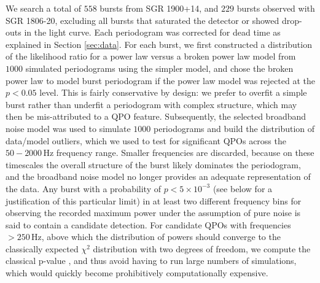 \documentclass[numberedappendix]{emulateapj}
\newcommand{\hz}{\,\mathrm{Hz}}
\begin{document}
We search a total of $558$ bursts from SGR 1900+14, and $229$ bursts observed with SGR 1806-20, excluding all bursts that saturated the detector or showed drop-outs in the light curve. 
Each periodogram was corrected for dead time as explained in Section \ref{sec:data}. 
For each burst, we first constructed a distribution of the likelihood ratio for a power law versus a broken power law model from $1000$ simulated periodograms using the simpler model, and
chose the broken power law to model burst periodogram if the power law model was rejected at the $p < 0.05$ level. This is fairly conservative by design: we prefer to overfit a simple burst rather than underfit a periodogram 
with complex structure, which may then be mis-attributed to a QPO feature. Subsequently, the selected broadband noise model was used to simulate $1000$ periodograms and build the
distribution of data/model outliers, which we used to test for significant QPOs across the $50 - 2000 \hz$ frequency range. Smaller frequencies are discarded, because on these timescales the overall structure of
the burst likely dominates the periodogram, and the broadband noise model no longer provides an adequate representation of the data. Any burst with a probability of $p < 5 \times 10^{-3}$ (see below for a justification of this particular limit) in at least two different frequency bins
for observing the recorded maximum power under the assumption of pure noise is said to contain a candidate detection. For candidate QPOs with frequencies $> 250 \hz$, above which the distribution of powers
should converge to the classically expected $\chi^2$ distribution with two degrees of freedom, we compute the classical p-value \citep{groth1975}, and thus avoid having to run large numbers of simulations, which 
would quickly become prohibitively computationally expensive. 
\end{document}
